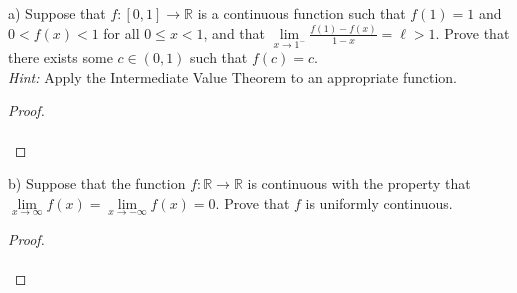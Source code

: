 a) Suppose that $f:[0, 1] \to \mathbb{R}$ is a continuous function such that $f(1) = 1$ and $0 < f(x) < 1$ for all 
   $0 \le x < 1$, and that $\lim\limits_{x \to 1^{-}}{\frac{f(1) - f(x)}{1 - x} = \ell > 1}$. Prove that there
   exists some $c \in (0, 1)$ such that $f(c) = c$. \ \\

   \emph{Hint:} Apply the Intermediate Value Theorem to an appropriate function.

\begin{proof}\renewcommand{\qedsymbol}{}\ \\\\
\end{proof}

\pagebreak

b) Suppose that the function $f:\mathbb{R} \to \mathbb{R}$ is continuous with the property that 
   $\lim\limits_{x \to \infty}{f(x)} = \lim\limits_{x \to -\infty}{f(x)} = 0$. Prove that $f$ is uniformly continuous.

\begin{proof}\renewcommand{\qedsymbol}{}\ \\\\
\end{proof}
